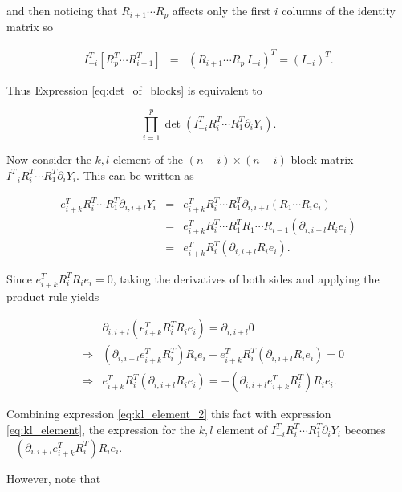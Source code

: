 \documentclass[ba]{imsart}
\numberwithin{equation}{section}
\theoremstyle{plain}
\begin{document}
\noindent and then noticing that $R_{i+1} \cdots R_p$ affects only the first $i$ columns of the identity matrix so 

\begin{eqnarray}
I_{-i}^T
\left[ R_p^T \cdots R_{i+1}^T\right]  &=& \left( R_{i+1} \cdots R_p\, I_{-i} \right)^T = \left( I_{-i} \right)^T.
\end{eqnarray}

\noindent Thus Expression \ref{eq:det_of_blocks} is equivalent to

\begin{equation}
\label{eq:simplified_determinant}
\prod_{i=1}^p \det \left( I_{-i}^T R_i^T \cdots R_1^T \partial_{i} Y_i \right).
\end{equation}

\noindent Now consider the $k,l$ element of the $(n-i) \times (n-i)$ block matrix $I_{-i}^T R_i^T \cdots R_1^T \partial_{i} Y_i $. This can be written as 

\begin{eqnarray}
\label{eq:kl_element}
e_{i+k}^T R_i^T \cdots R_1^T \partial_{i,i+l} Y_i &=&  e_{i+k}^T R_i^T \cdots R_1^T \partial_{i,i+l} (R_1 \cdots R_i e_i)\nonumber \\ \nonumber
&=&  e_{i+k}^T R_i^T \cdots R_1^T R_1 \cdots R_{i-1} (\partial_{i,i+l} R_i e_i)\nonumber \\ 
&=&  e_{i+k}^T R_i^T  (\partial_{i,i+l} R_i e_i).
\end{eqnarray}

\noindent Since  $e_{i+k}^T R_i^T R_i e_i =0$, taking the derivatives of both sides and applying the product rule yields

\begin{eqnarray}
\label{eq:kl_element_2}
&&\partial_{i,i+l} (e_{i+k}^T R_i^T R_i e_i) = \partial_{i,i+l} 0\nonumber \\
&\Rightarrow& (\partial_{i,i+l} e_{i+k}^T R_i^T) R_i e_i + e_{i+k}^T R_i^T ( \partial_{i,i+l}R_i e_i) = 0\nonumber \\
&\Rightarrow& e_{i+k}^T R_i^T  (\partial_{i,i+l}R_i e_i) = -(\partial_{i,i+l} e_{i+k}^T R_i^T) R_i e_i.
\end{eqnarray}

\noindent Combining expression \ref{eq:kl_element_2} this fact with expression \ref{eq:kl_element}, the expression for the $k,l$ element of $I_{-i}^T R_i^T \cdots R_1^T \partial_{i} Y_i $ becomes $-(\partial_{i,i+l} e_{i+k}^T R_i^T) R_i e_i$.

\noindent However, note that
\end{document}
